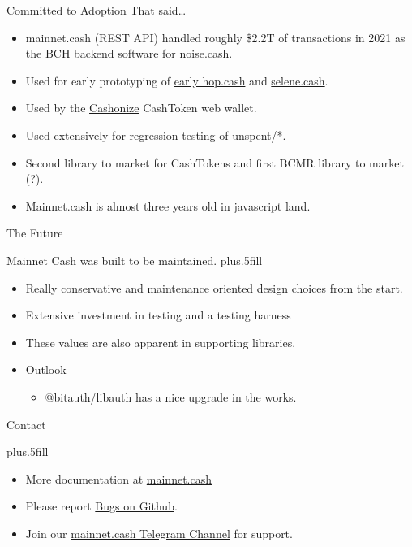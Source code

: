 \documentclass{beamer}
\begin{document}
\begin{frame}{Committed to Adoption}
  That said\dots

  \begin{itemize}  
\item
mainnet.cash (REST API) handled roughly \$2.2T of transactions in 2021 as the BCH backend software for noise.cash.
\item
Used for early prototyping of \href{https://old.hop.cash}{early hop.cash} and \href{https://selene.cash}{selene.cash}.
\item
Used by the \href{https://cashonize.com/}{Cashonize} CashToken web wallet.
\item
Used extensively for regression testing of \href{https://www.npmjs.com/package/@unspent/phi}{unspent/*}.
\item
Second library to market for CashTokens and first BCMR library to market (?).
\item
Mainnet.cash is almost three years old in javascript land.
\end{itemize}
\end{frame}

\begin{frame}{The Future}

Mainnet Cash was built to be maintained.
\vskip0pt plus.5fill

\begin{itemize}
\item
    Really conservative and maintenance oriented design choices from the start.
\item
    Extensive investment in testing and a testing harness
\item
    These values are also apparent in supporting libraries.
\end{itemize}


\begin{itemize}
\item
    Outlook
    \begin{itemize}
    \item
    \alert{@bitauth/libauth} has a nice upgrade in the works.
    \end{itemize}
\end{itemize}
\end{frame}

\begin{frame}{Contact}

    
    \vskip0pt plus.5fill
    
    \begin{itemize}

       \item More documentation at \href{https://mainnet.cash/}{mainnet.cash}
       \item Please report \href{https://github.com/mainnet-cash/mainnet-js/issues}{Bugs on Github}.
       \item Join our \href{https://t.me/mainnetcash}{ mainnet.cash Telegram Channel} for support.
    \end{itemize}

\end{frame}
\end{document}

